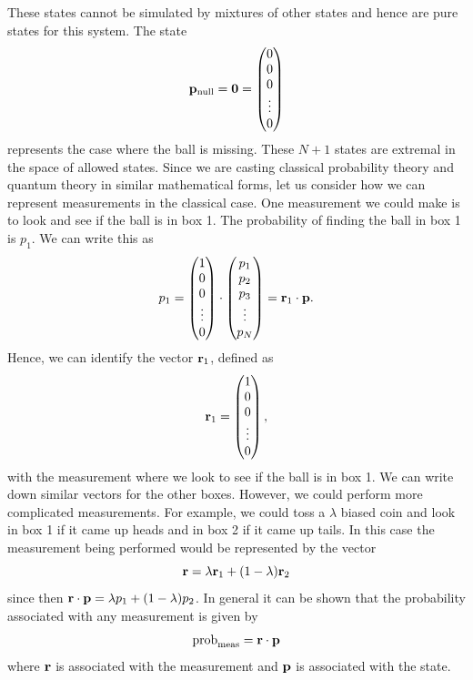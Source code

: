 \documentclass[12pt]{article}
\begin{document}
These states cannot be simulated by mixtures of other states and hence
are pure states for this system.
The state
\begin{equation}
{\bf p}_{\rm null}= {\bf 0} =
\left( \begin{matrix} 0 \\ 0 \\ 0 \\ \vdots \\ 0 \end{matrix} \right)
\end{equation}
represents the case where the ball is missing.
These $N+1$ states are extremal in the space of allowed states.
Since we are casting classical
probability theory and quantum theory in similar mathematical forms,
let us consider how we can represent measurements in the classical case.
One measurement we could make is to look and see if the ball is in box
1.  The probability of finding the ball in box 1 is $p_1$. We can write
this as
\begin{equation}
p_1=
\left(   \begin{matrix} 1 \\ 0 \\ 0 \\ \vdots \\ 0 \end{matrix} \right)
\cdot
\left(   \begin{matrix} p_1 \\ p_2 \\ p_3 \\ \vdots \\ p_N \end{matrix} \right)
={\bf r}_1\cdot {\bf p}.
\end{equation}
Hence, we can identify the vector ${\bf r}_1$, defined as
\begin{equation}
{\bf r}_1= \left(
\begin{matrix} 1 \\ 0 \\ 0 \\ \vdots \\ 0 \end{matrix} \right),
\end{equation}
with the measurement where we look to see if the ball is in box 1. We
can write down similar vectors for the other boxes.  However, we could
perform more complicated measurements.  For example, we could toss a
$\lambda$ biased coin and look in box 1 if it came up heads and in box 2
if it came up tails.  In this case the measurement being performed would
be represented by the vector
\begin{equation}
{\bf r}=\lambda{\bf r}_1+(1-\lambda){\bf r}_2
\end{equation}
since then ${\bf r}\cdot{\bf p}=\lambda p_1 + (1-\lambda)p_2$.
In general it can be shown that the probability associated with any
measurement is given by
\begin{equation}
{\rm prob}_{\rm meas} = {\bf r}\cdot{\bf p}
\end{equation}
where ${\bf r}$ is associated with the measurement and ${\bf p}$ is
associated with the state.
\end{document}
